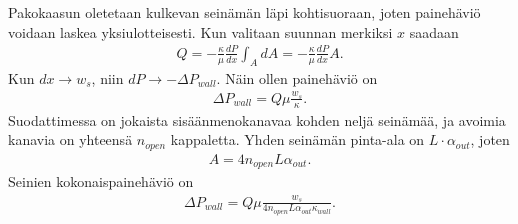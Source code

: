 Pakokaasun oletetaan kulkevan seinämän läpi kohtisuoraan, joten painehäviö voidaan laskea yksiulotteisesti. Kun valitaan suunnan merkiksi \(x\) saadaan
\begin{align}
    Q = - \frac{\kappa}{\mu} \frac{dP}{dx} \int_A dA = - \frac{\kappa}{\mu} \frac{dP}{dx} A.
\end{align}
Kun \(dx \to w_s\), niin \(dP \to -\Delta P_{wall}\). Näin ollen painehäviö on
\begin{align}
    \Delta P_{wall} = Q\mu \frac{w_s}{\kappa}.
\end{align}
Suodattimessa on jokaista sisäänmenokanavaa kohden neljä seinämää, ja avoimia kanavia on yhteensä \(n_{open}\) kappaletta. Yhden seinämän pinta-ala on \(L\cdot \alpha_{out}\), joten 
\begin{align}
    A = 4 n_{open} L \alpha_{out}.
\end{align}
Seinien kokonaispainehäviö on
\begin{align}
    \Delta P_{wall} =  Q \mu \frac{w_s}{4 n_{open} L  \alpha_{out}  \kappa_{wall}}.
\end{align}

